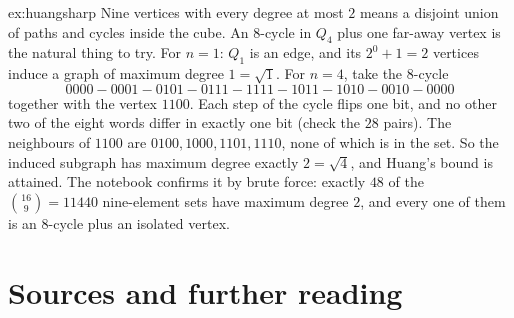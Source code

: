 \begin{solution}{ex:huangsharp}
\idea Nine vertices with every degree at most $2$ means a disjoint union of paths and cycles inside the cube. An $8$-cycle in $Q_4$
plus one far-away vertex is the natural thing to try.
\writeup For $n=1$: $Q_1$ is an edge, and its $2^0+1=2$ vertices induce a graph of maximum degree $1=\sqrt1$. For $n=4$, take the
$8$-cycle
\[
0000-0001-0101-0111-1111-1011-1010-0010-0000
\]
together with the vertex $1100$. Each step of the cycle flips one bit, and no other two of the eight words differ in exactly one
bit (check the $28$ pairs). The neighbours of $1100$ are $0100,1000,1101,1110$, none of which is in the set. So the induced
subgraph has maximum degree exactly $2=\sqrt4$, and Huang's bound is attained. The notebook confirms it by brute force: exactly
$48$ of the $\binom{16}9=11440$ nine-element sets have maximum degree $2$, and every one of them is an $8$-cycle plus an isolated
vertex.
\end{solution}

\section*{Sources and further reading}


